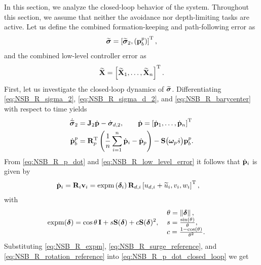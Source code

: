 In this section, we analyze the closed-loop behavior of the system.
Throughout this section, we assume that neither the avoidance nor depth-limiting tasks are active.
Let us define the combined formation-keeping and path-following error as 
\begin{equation}
    \widetilde{\bm{\sigma}} = \left[\widetilde{\bm{\sigma}}_2, \left(\mathbf{p}_b^p\right)\right]^{\mathrm{T}},
\end{equation}
and the combined low-level controller error as
\begin{equation}
    \widetilde{\mathbf{X}} = \left[\widetilde{\mathbf{X}}_1, \ldots, \widetilde{\mathbf{X}}_n\right]^{\mathrm{T}}.
\end{equation}
First, let us investigate the closed-loop dynamics of $\widetilde{\bm{\sigma}}$.
Differentiating \eqref{eq:NSB_R_sigma_2}, \eqref{eq:NSB_R_sigma_d_2}, and \eqref{eq:NSB_R_barycenter} with respect to time yields 
\begin{subequations}
\begin{align}
    \dot{\widetilde{\bm{\sigma}}}_2 &= \mathbf{J}_2\dot{\mathbf{p}} - \dot{\bm{\sigma}}_{d, 2}, \qquad \dot{\mathbf{p}} = \left[\dot{\mathbf{p}}_1, \ldots, \dot{\mathbf{p}}_n\right]^{\mathrm{T}} \\
    \dot{\mathbf{p}}_b^p &= \mathbf{R}_p^{\mathrm{T}}\left(\frac{1}{n}\sum_{i=1}^n\dot{\mathbf{p}}_i - \dot{\mathbf{p}}_p\right) - \mathbf{S}\big(\bm{\omega}_p\dot{s}\big)\mathbf{p}_b^p.
\end{align} \label{eq:NSB_R_dot_sigma_tilde}
\end{subequations}
From \eqref{eq:NSB_R_p_dot} and \eqref{eq:NSB_R_low_level_error} it follows that $\dot{\mathbf{p}}_i$ is given by 
\begin{align}
    \dot{\mathbf{p}}_i &= \mathbf{R}_i\mathbf{v}_i = {\rm expm}\left(\bm{\delta}_i\right)\mathbf{R}_{d, i}\left[u_{d, i} + \widetilde{u}_i, v_i, w_i\right]^{\mathrm{T}}, \label{eq:NSB_R_p_dot_closed_loop}
\end{align}
with 
\begin{align}
    {\rm expm}(\bs{\delta}) &= \cos\theta\,\mat{I} + s\mat{S}(\bs{\delta}) + c\mat{S}(\bs{\delta})^2\mathrlap{,} &
    &\begin{array}{l}
    \scale[1]{\theta = \norm{\bs{\delta}},} \\
    \scale[1]{s = \frac{\sin(\theta)}{\theta},} \\
    \scale[1]{c = \frac{1 - \cos(\theta)}{\theta^2}.}
    \end{array} \label{eq:NSB_R_expm}
\end{align}
Substituting \eqref{eq:NSB_R_expm}, \eqref{eq:NSB_R_surge_reference}, and \eqref{eq:NSB_R_rotation_reference} into \eqref{eq:NSB_R_p_dot_closed_loop} we get 
